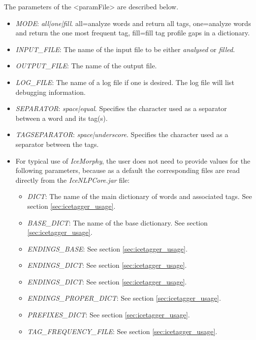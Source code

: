 \documentclass[11pt]{article}
\begin{document}
The parameters of the <paramFile> are described below.
\begin{itemize}
\item \emph{MODE}: \emph{all|one|fill}. all=analyze words and return all tags, one=analyze words and return the one most frequent tag, fill=fill tag profile gaps in a dictionary.
\item \emph{INPUT\_FILE}: The name of the input file to be either \emph{analysed} or \emph{filled}.
\item \emph{OUTPUT\_FILE}: The name of the output file.
\item \emph{LOG\_FILE}: The name of a log file if one is desired. The log file will list debugging information.
\item \emph{SEPARATOR}: \emph{space|equal}. Specifies the character used as a separator between a word and its tag(s).
\item \emph{TAGSEPARATOR}: \emph{space|underscore}. Specifies the character used as a separator between the tags.
\item For typical use of \textit{IceMorphy}, the user does not need to provide values for the following parameters, because as a default the corresponding files are read directly from the \emph{IceNLPCore.jar} file:
\begin{itemize}
\item \emph{DICT}: The name of the main dictionary of words and associated tags. See section \ref{sec:icetagger_usage}.
\item \emph{BASE\_DICT}: The name of the base dictionary. See section \ref{sec:icetagger_usage}.
\item \emph{ENDINGS\_BASE}: See section \ref{sec:icetagger_usage}.
\item \emph{ENDINGS\_DICT}: See section \ref{sec:icetagger_usage}.
\item \emph{ENDINGS\_DICT}: See section \ref{sec:icetagger_usage}.
\item \emph{ENDINGS\_PROPER\_DICT}: See section \ref{sec:icetagger_usage}.
\item \emph{PREFIXES\_DICT}: See section \ref{sec:icetagger_usage}.
\item \emph{TAG\_FREQUENCY\_FILE}: See section \ref{sec:icetagger_usage}.
\end{itemize}
\end{itemize}
\end{document}
